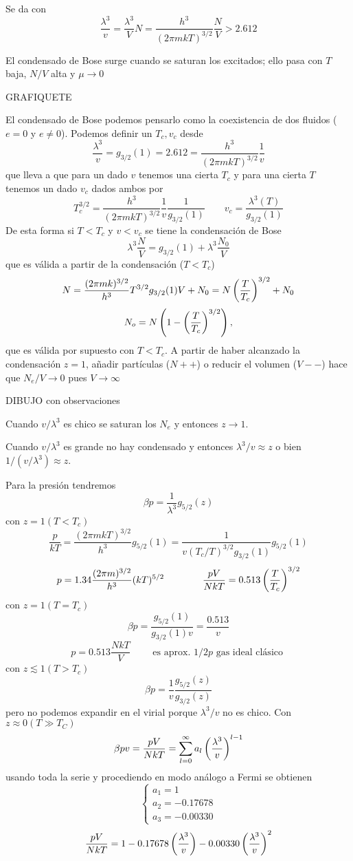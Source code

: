 \documentclass[10pt,oneside]{CBFT_book}
\begin{document}
Se da con 
\[
	\frac{\lambda^3}{v} = \frac{\lambda^3}{V} N = \frac{h^3}{(2\pi m kT)^{3/2}} \frac{N}{V} > 2.612
\]

El condensado de Bose surge cuando se saturan los excitados; ello pasa con $T$ baja, $N/V$
alta y $ \mu \to 0$

GRAFIQUETE

El condensado de Bose podemos pensarlo como la coexistencia de dos fluidos ($e=0$ y $e\neq 0$).
Podemos definir un $ T_c, v_c $ desde 
\[
	\frac{\lambda^3}{v} = g_{3/2}(1) = 2.612 = \frac{h^3}{(2 \pi m k T)^{3/2}} \frac{1}{v}
\]
que lleva a que para un dado $v$ tenemos una cierta $T_c$ y para una cierta $T$ tenemos un 
dado $v_c$ dados ambos por 
\[
	T_c^{3/2} = \frac{h^3}{(2 \pi m k T)^{3/2}} \frac{1}{v} \frac{1}{g_{3/2}(1)} \qquad 
	v_c = \frac{\lambda^3(T)}{g_{3/2}(1)}
\]
De esta forma si $ T<T_c$ y $v<v_c$ se tiene la condensación de Bose
\[
	\lambda^3\frac{N}{V} = g_{3/2}(1) + \lambda^3\frac{N_0}{V}
\]
que es válida a partir de la condensación ($T<T_c$)
\[
	N =  \frac{(2 \pi m k )^{3/2}}{h^3} T^{3/2} g_{3/2}(1)  V + N_0 = N \left( \frac{ T }{ T_c } \right)^{3/2} + N_0
\]
\[
	N_o = N \left( 1 - \left( \frac{ T }{ T_c } \right)^{3/2} \right),
\]
que es válida por supuesto con $T<T_c$.
A partir de haber alcanzado la condensación $z=1$, añadir partículas ($N++$) o reducir el volumen 
($V--$) hace que $N_e/V \to 0 $ pues $V \to \infty$

DIBUJO con observaciones

Cuando $v/\lambda^3$ es chico se saturan los $N_e$ y entonces $ z \to 1 $.

Cuando $v/\lambda^3$ es grande no hay condensado y entonces $ \lambda^3/v \approx z $ o bien
$ 1/ (v/\lambda^3) \approx z $.

Para la presión tendremos
\[
	\beta p = \frac{1}{\lambda^3} g_{5/2}(z)
\]
con $ z = 1 ( T < T_c ) $
\[
	\frac{p}{kT} = \frac{(2\pi m k T)^{3/2}}{h^3} g_{5/2}(1) = 
	\frac{1}{ v (T_c/T)^{3/2} g_{3/2}(1) } g_{5/2}(1)
\]
\[
	p = 1.34 \frac{(2\pi m )^{3/2}}{h^3} (kT)^{5/2} \qquad \qquad 
	\frac{pV}{NkT} = 0.513 \left( \frac{ T }{ T_c } \right)^{3/2}
\]
con $ z = 1 ( T = T_c ) $
\[
	\beta p = \frac{ g_{5/2}(1) }{ g_{3/2}(1) v } = \frac{0.513}{v}
\]
\[
	p = 0.513 \frac{NkT}{V} \qquad \text{ es aprox. $1/2 p$ gas ideal clásico }
\]
con $ z \lesssim 1 ( T > T_c ) $
\[
	\beta p = \frac{1}{v} \frac{ g_{5/2}(z) }{ g_{3/2}(z) }
\]
pero no podemos expandir en el virial porque $ \lambda^3 / v $ no es chico.
Con $ z \approx 0 ( T \gg T_C ) $
\[
	\beta p v = \frac{pV}{NkT} = \sum_{l=0}^\infty a_l \left( \frac{ \lambda^3 }{ v } \right)^{l-1}
\]
usando toda la serie y procediendo en modo análogo a Fermi se obtienen
\[
	\begin{cases}
	 a_1 = 1 \\
	 a_2 = -0.17678 \\
	 a_3 = -0.00330
	\end{cases}
\]
\[
	\frac{pV}{NkT} = 1 - 0.17678 \left( \frac{ \lambda^3 }{ v } \right) - 0.00330 \left( \frac{ \lambda^3 }{ v } \right)^2
\]
\end{document}
